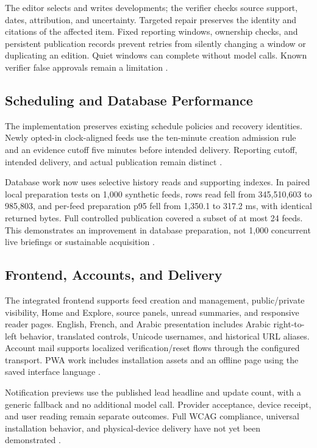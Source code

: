 The editor selects and writes developments; the verifier checks source support, dates, attribution, and uncertainty. Targeted repair preserves the identity and citations of the affected item. Fixed reporting windows, ownership checks, and persistent publication records prevent retries from silently changing a window or duplicating an edition. Quiet windows can complete without model calls. Known verifier false approvals remain a limitation \cite{v3overnight,v3twenty,controlledreliability}.

\subsection{Scheduling and Database Performance}

The implementation preserves existing schedule policies and recovery identities. Newly opted-in clock-aligned feeds use the ten-minute creation admission rule and an evidence cutoff five minutes before intended delivery. Reporting cutoff, intended delivery, and actual publication remain distinct \cite{clockpolicy}.

Database work now uses selective history reads and supporting indexes. In paired local preparation tests on 1,000 synthetic feeds, rows read fell from 345,510,603 to 985,803, and per-feed preparation p95 fell from 1,350.1 to 317.2 ms, with identical returned bytes. Full controlled publication covered a subset of at most 24 feeds. This demonstrates an improvement in database preparation, not 1,000 concurrent live briefings or sustainable acquisition \cite{capacityevaluation,boundedhistory}.

\subsection{Frontend, Accounts, and Delivery}

The integrated frontend supports feed creation and management, public/private visibility, Home and Explore, source panels, unread summaries, and responsive reader pages. English, French, and Arabic presentation includes Arabic right-to-left behavior, translated controls, Unicode usernames, and historical URL aliases. Account mail supports localized verification/reset flows through the configured transport. PWA work includes installation assets and an offline page using the saved interface language \cite{preservation,frontendrecord}.

Notification previews use the published lead headline and update count, with a generic fallback and no additional model call. Provider acceptance, device receipt, and user reading remain separate outcomes. Full WCAG compliance, universal installation behavior, and physical-device delivery have not yet been demonstrated \cite{notificationeval}.


